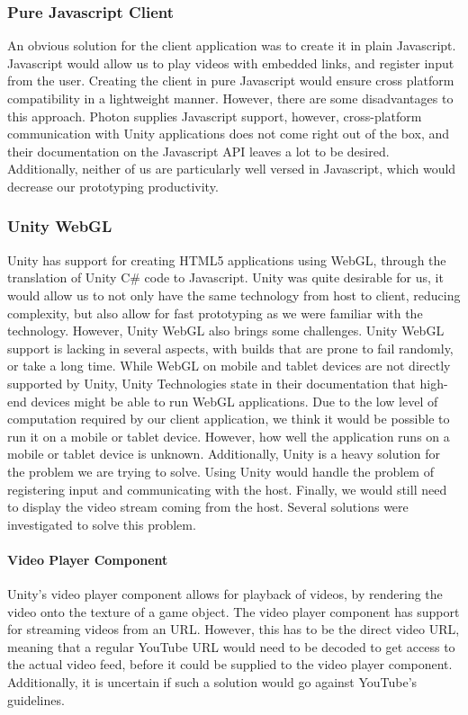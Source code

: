 \subsubsection{Pure Javascript Client}
An obvious solution for the client application was to create it in plain Javascript. Javascript would allow us to play videos with embedded links, and register input from the user. Creating the client in pure Javascript would ensure cross platform compatibility in a lightweight manner. However, there are some disadvantages to this approach. Photon supplies Javascript support, however, cross-platform communication with Unity applications does not come right out of the box\cite{photon_javascript}, and their documentation on the Javascript API leaves a lot to be desired. Additionally, neither of us are particularly well versed in Javascript, which would decrease our prototyping productivity. 

\subsubsection{Unity WebGL}
Unity has support for creating HTML5 applications using WebGL\cite{unity_webgl}, through the translation of Unity C\# code to Javascript. Unity was quite desirable for us, it would allow us to not only have the same technology from host to client, reducing complexity, but also allow for fast prototyping as we were familiar with the technology. 
However, Unity WebGL also brings some challenges. Unity WebGL support is lacking in several aspects, with builds that are prone to fail randomly, or take a long time. While WebGL on mobile and tablet devices are not directly supported by Unity, Unity Technologies state in their documentation that high-end devices might be able to run WebGL applications\cite{unity_webl_browser_support}. Due to the low level of computation required by our client application, we think it would be possible to run it on a mobile or tablet device. However, how well the application runs on a mobile or tablet device is unknown. Additionally, Unity is a heavy solution for the problem we are trying to solve.
Using Unity would handle the problem of registering input and communicating with the host. Finally, we would still need to display the video stream coming from the host. Several solutions were investigated to solve this problem.

\paragraph{Video Player Component}
Unity's video player component allows for playback of videos, by rendering the video onto the texture of a game object\cite{unity_video_player}. The video player component has support for streaming videos from an URL. However, this has to be the direct video URL, meaning that a regular YouTube URL would need to be decoded to get access to the actual video feed, before it could be supplied to the video player component. Additionally, it is uncertain if such a solution would go against YouTube's guidelines\cite[5.1 A]{youtube_guidelines}.

